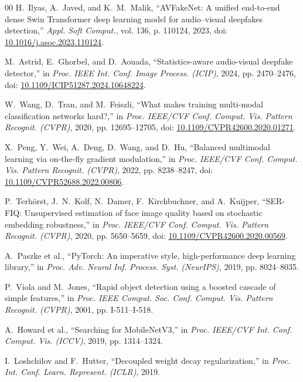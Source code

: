 \documentclass[conference]{IEEEtran}
\begin{document}
\begin{thebibliography}{00}
H.~Ilyas, A.~Javed, and K.~M.~Malik, ``AVFakeNet: A unified end-to-end dense Swin Transformer deep learning model for audio--visual deepfakes detection,'' \emph{Appl. Soft Comput.}, vol. 136, p. 110124, 2023, doi: \href{https://doi.org/10.1016/j.asoc.2023.110124}{10.1016/j.asoc.2023.110124}.

M.~Astrid, E.~Ghorbel, and D.~Aouada, ``Statistics-aware audio-visual deepfake detector,'' in \emph{Proc. IEEE Int. Conf. Image Process. (ICIP)}, 2024, pp. 2470--2476, doi: \href{https://doi.org/10.1109/ICIP51287.2024.10648224}{10.1109/ICIP51287.2024.10648224}.

W.~Wang, D.~Tran, and M.~Feiszli, ``What makes training multi-modal classification networks hard?,'' in \emph{Proc. IEEE/CVF Conf. Comput. Vis. Pattern Recognit. (CVPR)}, 2020, pp. 12695--12705, doi: \href{https://doi.org/10.1109/CVPR42600.2020.01271}{10.1109/CVPR42600.2020.01271}.

X.~Peng, Y.~Wei, A.~Deng, D.~Wang, and D.~Hu, ``Balanced multimodal learning via on-the-fly gradient modulation,'' in \emph{Proc. IEEE/CVF Conf. Comput. Vis. Pattern Recognit. (CVPR)}, 2022, pp. 8238--8247, doi: \href{https://doi.org/10.1109/CVPR52688.2022.00806}{10.1109/CVPR52688.2022.00806}.

P.~Terh{\"o}rst, J.~N.~Kolf, N.~Damer, F.~Kirchbuchner, and A.~Kuijper, ``SER-FIQ: Unsupervised estimation of face image quality based on stochastic embedding robustness,'' in \emph{Proc. IEEE/CVF Conf. Comput. Vis. Pattern Recognit. (CVPR)}, 2020, pp. 5650--5659, doi: \href{https://doi.org/10.1109/CVPR42600.2020.00569}{10.1109/CVPR42600.2020.00569}.

A.~Paszke et al., ``PyTorch: An imperative style, high-performance deep learning library,'' in \emph{Proc. Adv. Neural Inf. Process. Syst. (NeurIPS)}, 2019, pp. 8024--8035.

P.~Viola and M.~Jones, ``Rapid object detection using a boosted cascade of simple features,'' in \emph{Proc. IEEE Comput. Soc. Conf. Comput. Vis. Pattern Recognit. (CVPR)}, 2001, pp. I-511--I-518.

A.~Howard et al., ``Searching for MobileNetV3,'' in \emph{Proc. IEEE/CVF Int. Conf. Comput. Vis. (ICCV)}, 2019, pp. 1314--1324.

I.~Loshchilov and F.~Hutter, ``Decoupled weight decay regularization,'' in \emph{Proc. Int. Conf. Learn. Represent. (ICLR)}, 2019.


\end{thebibliography}
\end{document}
